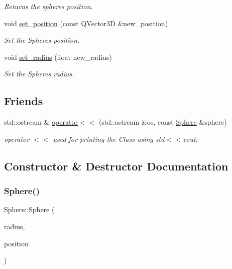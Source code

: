 \begin{DoxyCompactItemize}
\begin{DoxyCompactList}\small\item\em Returns the spheres position. \end{DoxyCompactList}\item 
void \mbox{\hyperlink{class_sphere_ad050355312225f312b676edc376158e1}{set\+\_\+position}} (const Q\+Vector3D \&new\+\_\+position)
\begin{DoxyCompactList}\small\item\em Set the Spheres position. \end{DoxyCompactList}\item 
void \mbox{\hyperlink{class_sphere_a293cdd84dea67955c6a7d14e86c8d919}{set\+\_\+radius}} (float new\+\_\+radius)
\begin{DoxyCompactList}\small\item\em Set the Spheres radius. \end{DoxyCompactList}\end{DoxyCompactItemize}
\subsection*{Friends}
\begin{DoxyCompactItemize}
\item 
std\+::ostream \& \mbox{\hyperlink{class_sphere_adeb07662f568bb893f87459c082f00b2}{operator$<$$<$}} (std\+::ostream \&os, const \mbox{\hyperlink{class_sphere}{Sphere}} \&sphere)
\begin{DoxyCompactList}\small\item\em operator $<$$<$ used for printing the Class using std$<$$<$cout; \end{DoxyCompactList}\end{DoxyCompactItemize}


\subsection{Constructor \& Destructor Documentation}
\mbox{\label{class_sphere_a507519d4ee1d48277626fe3c74e8228b}} 
\subsubsection{\texorpdfstring{Sphere()}{Sphere()}}
{\footnotesize\ttfamily Sphere\+::\+Sphere (\begin{DoxyParamCaption}\item[{float}]{radius,  }\item[{const Q\+Vector3D \&}]{position }\end{DoxyParamCaption})}



